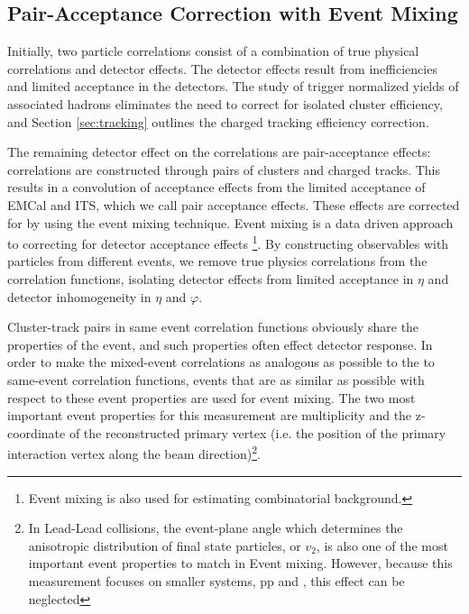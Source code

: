 \subsection{Pair-Acceptance Correction with Event Mixing}

\label{sec:EventMixing}
Initially, two particle correlations consist of a combination of true physical correlations and detector effects. The detector effects result from inefficiencies and limited acceptance in the detectors. The study of trigger normalized yields of associated hadrons eliminates the need to correct for isolated cluster efficiency, and Section \ref{sec:tracking} outlines the charged tracking efficiency correction. %

The remaining detector effect on the correlations are pair-acceptance effects:
correlations are constructed through pairs of clusters and charged tracks. This results in a convolution of acceptance effects from the limited acceptance of EMCal and ITS, which we call pair acceptance effects. These effects are corrected for by using the event mixing technique. Event mixing is a data driven approach to correcting for detector acceptance effects \footnote{Event mixing is also used for estimating combinatorial background.}. By constructing observables with particles from different events, we remove true physics correlations from the correlation functions, isolating detector effects from limited acceptance in \(\eta\) and detector inhomogeneity in $\eta$ and $\varphi$. 


Cluster-track pairs in same event correlation functions obviously share the properties of the event, and such properties often effect detector response. In order to make the mixed-event correlations as analogous as possible to the to same-event correlation functions, events that are as similar as possible with respect to these event properties are used for event mixing. The two most important event properties for this measurement are multiplicity and the z-coordinate of the reconstructed primary vertex (i.e. the position of the primary interaction vertex along the beam direction)\footnote{In Lead-Lead collisions, the event-plane angle which determines the anisotropic distribution of final state particles, or $v_{2}$, is also one of the most important event properties to match in Event mixing. However, because this measurement focuses on smaller systems, pp and \pPb, this effect can be neglected}. %



